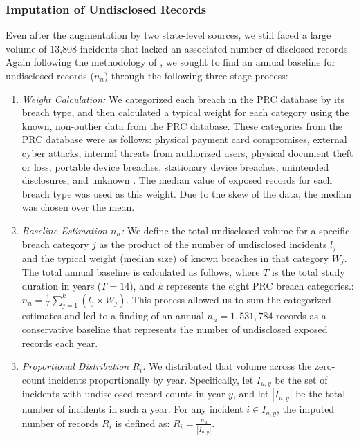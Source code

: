 
\subsubsection{Imputation of Undisclosed Records}
\label{sec:imputation_of_undisclosed}

Even after the augmentation by two state-level sources,
we still faced a large volume of 13,808 incidents that lacked an associated number of disclosed records. Again following the methodology of \cite{Graves2018Should}, we sought to find an annual baseline for undisclosed records ($n_u$) through the following three-stage process: 

\begin{enumerate}[label=(\alph*)]
    \item \textit{Weight Calculation:} We categorized each breach in the PRC database by its breach type, and then calculated a typical weight for each category using the known, non-outlier data from the PRC database. These categories from the PRC database were as follows: physical payment card compromises, external cyber attacks, internal threats from authorized users, physical document theft or loss, portable device breaches, stationary device breaches, unintended disclosures, and unknown \cite{PRC_Chronology}. The median value of exposed records for each breach type was used as this weight. Due to the skew of the data, the median was chosen over the mean. 
    
    \item \textit{Baseline Estimation $n_u$:} We define the total undisclosed volume for a specific breach category $j$ as the product of the number of undisclosed incidents $l_j$ and the typical weight (median size) of known breaches in that category $W_j$. The total annual baseline is calculated as follows, where $T$ is the total study duration in years ($T=14$), and $k$ represents the eight PRC breach categories.: $n_u = \frac{1}{T} \sum_{j=1}^k (l_j \times W_j)$. This process allowed us to sum the categorized estimates and led to a finding of an annual $n_u = 1,531,784$ records as a conservative baseline that represents the number of undisclosed exposed records each year.

    \item \textit{Proportional Distribution $R_i$: }We distributed that volume across the zero-count incidents proportionally by year. Specifically, let $I_{u,y}$ be the set of incidents with undisclosed record counts in year $y$, and let $|I_{u,y}|$ be the total number of incidents in such a year. For any incident $i \in I_{u,y}$, the imputed number of records $R_i$ is defined as: $R_i = \frac{n_u}{|I_{u,y}|}$.
\end{enumerate}

